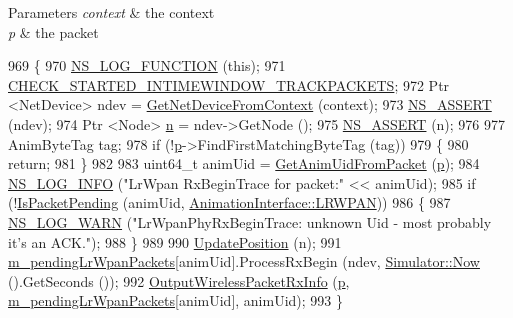 \begin{DoxyParams}{Parameters}
{\em context} & the context \\
\hline
{\em p} & the packet \\
\hline
\end{DoxyParams}

\begin{DoxyCode}
969 \{
970   \hyperlink{log-macros-disabled_8h_a90b90d5bad1f39cb1b64923ea94c0761}{NS\_LOG\_FUNCTION} (\textcolor{keyword}{this});
971   \hyperlink{animation-interface_8h_acdf351a3155a6ccf1813189e10dba8f5}{CHECK\_STARTED\_INTIMEWINDOW\_TRACKPACKETS};
972   Ptr <NetDevice> ndev = \hyperlink{classns3_1_1AnimationInterface_a5054e94f0c5e3d0a4443cfbe52e2ea30}{GetNetDeviceFromContext} (context);
973   \hyperlink{assert_8h_a6dccdb0de9b252f60088ce281c49d052}{NS\_ASSERT} (ndev);
974   Ptr <Node> \hyperlink{namespacesample-rng-plot_aeb5ee5c431e338ef39b7ac5431242e1d}{n} = ndev->GetNode ();
975   \hyperlink{assert_8h_a6dccdb0de9b252f60088ce281c49d052}{NS\_ASSERT} (n);
976 
977   AnimByteTag tag;
978   \textcolor{keywordflow}{if} (!\hyperlink{lte__link__budget_8m_ac9de518908a968428863f829398a4e62}{p}->FindFirstMatchingByteTag (tag))
979     \{
980       \textcolor{keywordflow}{return};
981     \}
982 
983   uint64\_t animUid = \hyperlink{classns3_1_1AnimationInterface_a18e6a184ccd7dee800bf734f8adc818c}{GetAnimUidFromPacket} (\hyperlink{lte__link__budget_8m_ac9de518908a968428863f829398a4e62}{p});
984   \hyperlink{group__logging_gafbd73ee2cf9f26b319f49086d8e860fb}{NS\_LOG\_INFO} (\textcolor{stringliteral}{"LrWpan RxBeginTrace for packet:"} << animUid);
985   \textcolor{keywordflow}{if} (!\hyperlink{classns3_1_1AnimationInterface_a0bee27aa30e136d5035050ec2ef0012d}{IsPacketPending} (animUid, \hyperlink{classns3_1_1AnimationInterface_a801a4efd553ff0d1d768cd70d22456b6a6356c745a7c48e2f8789f87a4f90da89}{AnimationInterface::LRWPAN}))
986     \{
987       \hyperlink{group__logging_gade7208b4009cdf0e25783cd26766f559}{NS\_LOG\_WARN} (\textcolor{stringliteral}{"LrWpanPhyRxBeginTrace: unknown Uid - most probably it's an ACK."});
988     \}
989 
990   \hyperlink{classns3_1_1AnimationInterface_ab751cf6f459289f0978f4bb97b93044d}{UpdatePosition} (n);
991   \hyperlink{classns3_1_1AnimationInterface_aa5fe4fe78cfa8cd3da785292a4a18b71}{m\_pendingLrWpanPackets}[animUid].ProcessRxBegin (ndev, 
      \hyperlink{classns3_1_1Simulator_ac3178fa975b419f7875e7105be122800}{Simulator::Now} ().GetSeconds ());
992   \hyperlink{classns3_1_1AnimationInterface_ae7dbb6c566787d3444e3fcba367e5338}{OutputWirelessPacketRxInfo} (\hyperlink{lte__link__budget_8m_ac9de518908a968428863f829398a4e62}{p}, 
      \hyperlink{classns3_1_1AnimationInterface_aa5fe4fe78cfa8cd3da785292a4a18b71}{m\_pendingLrWpanPackets}[animUid], animUid);
993 \}
\end{DoxyCode}


